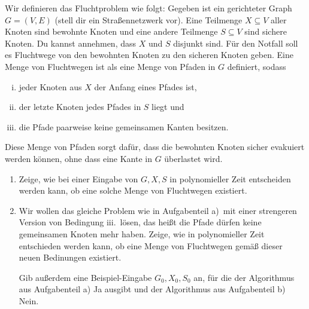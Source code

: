 \documentclass{uebung_cs}
\begin{document}
\begin{aufgabe}[Fluchtwege]
    Wir definieren das Fluchtproblem wie folgt: Gegeben ist ein gerichteter Graph $G = (V,E)$ (stell dir ein Straßennetzwerk vor). Eine Teilmenge $X \subseteq V$ aller Knoten sind bewohnte Knoten und eine andere Teilmenge $S \subseteq V$ sind sichere Knoten. Du kannst annehmen, dass $X$ und $S$ disjunkt sind. Für den Notfall soll es Fluchtwege von den bewohnten Knoten zu den sicheren Knoten geben. Eine Menge von Fluchtwegen ist als eine Menge von Pfaden in $G$ definiert, sodass
    \begin{enumerate}[i.]
      \item jeder Knoten aus $X$ der Anfang eines Pfades ist,
      \item der letzte Knoten jedes Pfades in $S$ liegt und
      \item die Pfade paarweise keine gemeinsamen Kanten besitzen.   
    \end{enumerate}
    Diese Menge von Pfaden sorgt dafür, dass die bewohnten Knoten sicher evakuiert werden können, ohne dass eine Kante in $G$ überlastet wird.
    \begin{enumerate}
    	\item Zeige, wie bei einer Eingabe von $G, X, S$ in polynomieller Zeit entscheiden werden kann, ob eine solche Menge von Fluchtwegen existiert.
    	\item Wir wollen das gleiche Problem wie in Aufgabenteil a)~mit einer strengeren Version von Bedingung iii.~lösen, das heißt die Pfade dürfen keine gemeinsamen Knoten mehr haben.
    	Zeige, wie in polynomieller Zeit entschieden werden kann, ob eine Menge von Fluchtwegen gemäß dieser neuen Bedinungen existiert.
    	
    	Gib außerdem eine Beispiel-Eingabe $G_0, X_0, S_0$ an, für die der Algorithmus aus Aufgabenteil a) \glqq Ja\grqq{} ausgibt und der Algorithmus aus Aufgabenteil b) \glqq Nein\grqq.
    \end{enumerate}
\end{aufgabe}
\end{document}
